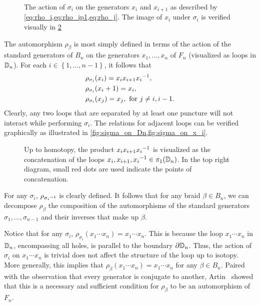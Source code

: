 \begin{figure}[htbp]
    \centering
    
    \caption{The action of $\sigma_i$ on the generators $x_i$ and $x_{i+1}$ as described by \cref{eq:rho_i,eq:rho_ip1,eq:rho_j}. The image of $x_i$ under $\sigma_i$ is verified visually in \cref{fig:sigma_on_x_i}}\label{fig:sigma_on_Dn}
\end{figure}

The automorphism $\rho_\beta$ is most simply defined in terms of the action of the standard generators of $B_n$ on the generators $x_1,\dots,x_n$ of $F_n$ (visualized as loops in $\mathbb{D}_n$). For each $i\in\left\{ 1,\dots,n-1 \right\}$, it follows that
\begin{align}
    &\rho_{\sigma_i}(x_{i}) = x_{i}x_{i+1} { x_{i} }^{-1}, \label{eq:rho_i}\\
    &\rho_{\sigma_i}(x_i+1) = x_{i}, \label{eq:rho_ip1}\\
    &\rho_{\sigma_i}(x_j) = x_j, \textrm{ for } j\neq i,i-1.\label{eq:rho_j}
\end{align}
Clearly, any two loops that are separated by at least one puncture will not interact while performing $\sigma_i$. The relations for adjacent loops can be verified graphically as illustrated in \cref{fig:sigma_on_Dn,fig:sigma_on_x_i}.
\begin{figure}[htbp]
    \centering
    
    \caption{Up to homotopy, the product $x_i x_{i+1} { x_i }^{-1}$ is visualized as the concatenation of the loops $x_i,x_{i+1},{ x_i }^{-1}\in\pi_1(\mathbb{D}_n)$. In the top right diagram, small red dots are used indicate the points of concatenation.}\label{fig:sigma_on_x_i}
\end{figure}

For any $\sigma_i$, $\rho_{{ \sigma_i }^{-1}}$ is clearly defined. It follows that for any braid $\beta\in B_n$, we can decompose $\rho_\beta$ the composition of the automorphisms of the standard generators $\sigma_1,\dots,\sigma_{n-1}$ and their inverses that make up $\beta$. 

Notice that for any $\sigma_i$, $\rho_{\sigma_i}(x_1\cdots x_n) = x_1\cdots x_n$. This is because the loop $x_1\cdots x_n$ in $\mathbb{D}_n$, encompassing all holes, is parallel to the boundary $\partial\mathbb{D}_n$. Thus, the action of $\sigma_i$ on $x_1\cdots x_n$ is trivial does not affect the structure of the loop up to isotopy. More generally, this implies that $\rho_\beta(x_1\cdots x_n) = x_1\cdots x_n$ for any $\beta\in B_n$. Paired with the observation that every generator is conjugate to another, Artin~\cite{Artin1947} showed that this is a necessary and sufficient condition for $\rho_\beta$ to be an automorphism of $F_n$.

